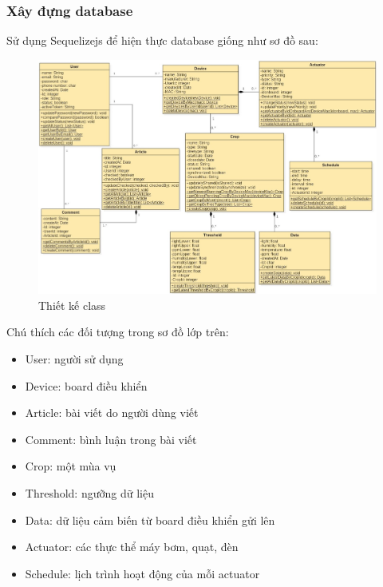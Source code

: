 \documentclass[a4paper,12pt,oneside]{article}
\begin{document}
\subsubsection{Xây đựng database}
\noindent Sử dụng Sequelizejs để hiện thực database giống như sơ đồ sau:
\begin{landscape}
\begin{center}
\begin{figure}[b]
\begin{center}
\includegraphics[scale=0.64]{hinh/class_diagram.jpg}
\end{center}
\caption{ Thiết kế class}
\end{figure}
\end{center}
\end{landscape}
\newpage
Chú thích các đối tượng trong sơ đồ lớp trên:
\begin{itemize}
\item User: người sử dụng
\item Device: board điều khiển
\item Article: bài viết do người dùng viết
\item Comment: bình luận trong bài viết
\item Crop: một mùa vụ
\item Threshold: ngưỡng dữ liệu
\item Data: dữ liệu cảm biến từ board điều khiển gửi lên
\item Actuator: các thực thể máy bơm, quạt, đèn
\item Schedule: lịch trình hoạt động của mỗi actuator
\end{itemize}
\end{document}
